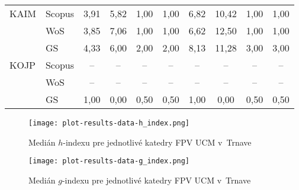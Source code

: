 \begin{table}
\begin{tabularx}{\textwidth}{XXcccc@{\hspace{3ex}}cccc}
 KAIM & Scopus & 3,91    & 5,82  & 1,00  & 1,00  & 6,82    & 10,42 & 1,00  & 1,00  \\
      & WoS    & 3,85    & 7,06  & 1,00  & 1,00  & 6,62    & 12,50 & 1,00  & 1,00  \\
      & GS     & 4,33    & 6,00  & 2,00  & 2,00  & 8,13    & 11,28 & 3,00  & 3,00  \\[3ex]
 KOJP & Scopus & --      & --    & --    & --    & --      & --    & --    & --    \\
      & WoS    & --      & --    & --    & --    & --      & --    & --    & --    \\
      & GS     & 1,00    & 0,00  & 0,50  & 0,50  & 1,00    & 0,00  & 0,50  & 0,50  \\[0.5ex]
  \bottomrule
\end{tabularx}
\end{table}

\begin{figure}
  \centering
  \texttt{[image: plot-results-data-h\_index.png]}
  \caption{Medián $h$-indexu pre jednotlivé katedry FPV UCM v~Trnave}
  \label{fig:h-index.plot}
\end{figure}

\begin{figure}
  \centering
  \texttt{[image: plot-results-data-g\_index.png]}
  \caption{Medián $g$-indexu pre jednotlivé katedry FPV UCM v~Trnave}
  \label{fig:g-index.plot}
\end{figure}


